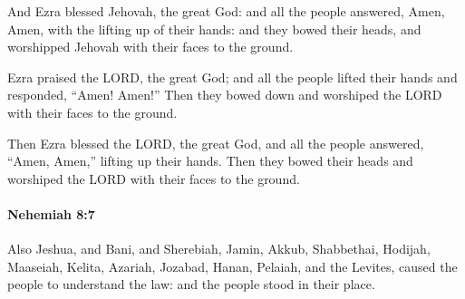 			\begin{versebox}
					\item[BHS] 
					\item[LXX] 
					\item[ASV] And Ezra blessed Jehovah, the great God: and all the people answered, Amen, Amen, with the lifting up of their hands: and they bowed their heads, and worshipped Jehovah with their faces to the ground.
					\item[NIV] Ezra praised the LORD, the great God; and all the people lifted their hands and responded, “Amen! Amen!” Then they bowed down and worshiped the LORD with their faces to the ground.
					\item[NRSV] Then Ezra blessed the LORD, the great God, and all the people answered, “Amen, Amen,” lifting up their hands. Then they bowed their heads and worshiped the LORD with their faces to the ground.
			\end{versebox}

		\paragraph{Nehemiah 8:7} %
			\label{NEHEMIAH-8-7}

			Also Jeshua, and Bani, and Sherebiah, Jamin, Akkub, Shabbethai, Hodijah, Maaseiah, Kelita, Azariah, Jozabad, Hanan, Pelaiah, and the Levites, caused the people to understand the law: and the people stood in their place.

